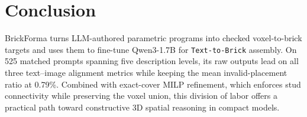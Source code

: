 \section{Conclusion}
BrickForma turns LLM-authored parametric programs into checked voxel-to-brick targets and uses them to fine-tune Qwen3-1.7B for \texttt{Text-to-Brick} assembly. On 525 matched prompts spanning five description levels, its raw outputs lead on all three text--image alignment metrics while keeping the mean invalid-placement ratio at 0.79\%. Combined with exact-cover MILP refinement, which enforces stud connectivity while preserving the voxel union, this division of labor offers a practical path toward constructive 3D spatial reasoning in compact models.
